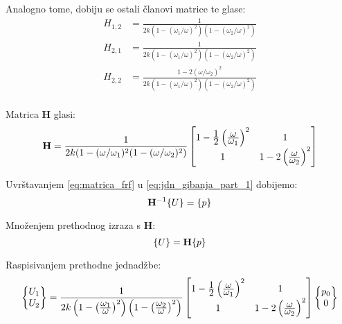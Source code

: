 Analogno tome, dobiju se ostali članovi matrice te glase:
\begin{align}
    H_{1,2} &= \frac{1}{2k(1-(\omega_1/\omega)^2)(1-(\omega_2/\omega)^2)}\label{eq:frf_12}\\
    H_{2,1} &= \frac{1}{2k(1-(\omega_1/\omega)^2)(1-(\omega_2/\omega)^2)}\label{eq:frf_21}\\
    H_{2,2} &= \frac{1-2(\omega/\omega_2)^2}{2k(1-(\omega_1/\omega)^2)(1-(\omega_2/\omega)^2)}\label{eq:frf_22}\\
\end{align}

Matrica $\mathbf{H}$ glasi:
\begin{equation}\label{eq:matrica_frf}
    \mathbf{H}=\frac{1}{2k(1-(\omega/\omega_1)^2(1-(\omega/\omega_2)^2)}
    \begin{bmatrix}
        1-\frac{\displaystyle 1}{\displaystyle 2}\left(\frac{\displaystyle \omega}{\displaystyle \omega_1}\right)^2 & 1 \\
        1 & 1-2\left(\frac{\displaystyle \omega}{\displaystyle \omega_2}\right)^2
    \end{bmatrix}
\end{equation}

Uvrštavanjem \eqref{eq:matrica_frf} u \eqref{eq:jdn_gibanja_part_1} dobijemo:
\begin{equation}
    \mathbf{H}^{-1}\vtor{U}{}=\vtor{p}{}
\end{equation}

Množenjem prethodnog izraza s $\mathbf{H}$:
\begin{equation}
    \vtor{U}{} = \mathbf{H}\vtor{p}{}
\end{equation}

Raspisivanjem prethodne jednadžbe:
\begin{equation}
    \begin{Bmatrix}
        U_1\\
        U_2
    \end{Bmatrix}
    =
    \frac{1}{2k\left(1-\left(\frac{\displaystyle \omega_1}{\displaystyle \omega}\right)^2\right)\left(1-\left(\frac{\displaystyle \omega_2}{\displaystyle \omega}\right)^2\right)}
    \begin{bmatrix}
        1-\frac{\displaystyle 1}{\displaystyle 2}\left(\frac{\displaystyle \omega}{\displaystyle \omega_1}\right)^2 & 1 \\
        1 & 1-2\left(\frac{\displaystyle \omega}{\displaystyle \omega_2}\right)^2
    \end{bmatrix}
    \begin{Bmatrix}
        p_0\\
        0
    \end{Bmatrix}
\end{equation}

